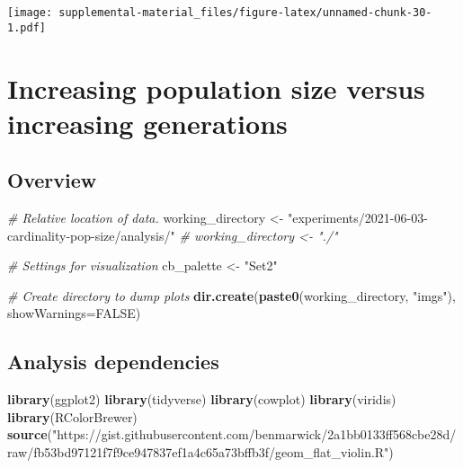 \documentclass[]{book}
\newenvironment{Shaded}{\begin{snugshade}}{\end{snugshade}}
\newcommand{\CommentTok}[1]{\textcolor[rgb]{0.56,0.35,0.01}{\textit{#1}}}
\newcommand{\DataTypeTok}[1]{\textcolor[rgb]{0.13,0.29,0.53}{#1}}
\newcommand{\KeywordTok}[1]{\textcolor[rgb]{0.13,0.29,0.53}{\textbf{#1}}}
\newcommand{\NormalTok}[1]{#1}
\newcommand{\OtherTok}[1]{\textcolor[rgb]{0.56,0.35,0.01}{#1}}
\newcommand{\StringTok}[1]{\textcolor[rgb]{0.31,0.60,0.02}{#1}}
\begin{document}
\texttt{[image: supplemental-material\_files/figure-latex/unnamed-chunk-30-1.pdf]}

\hypertarget{increasing-population-size-versus-increasing-generations}{%
\chapter{Increasing population size versus increasing generations}\label{increasing-population-size-versus-increasing-generations}}

\hypertarget{overview-2}{%
\section{Overview}\label{overview-2}}

\begin{Shaded}
\begin{Highlighting}[]
\CommentTok{# Relative location of data.}
\NormalTok{working_directory <-}
\StringTok{  "experiments/2021-06-03-cardinality-pop-size/analysis/"}
\CommentTok{# working_directory <- "./"}

\CommentTok{# Settings for visualization}
\NormalTok{cb_palette <-}\StringTok{ "Set2"}

\CommentTok{# Create directory to dump plots}
\KeywordTok{dir.create}\NormalTok{(}\KeywordTok{paste0}\NormalTok{(working_directory, }\StringTok{"imgs"}\NormalTok{), }\DataTypeTok{showWarnings=}\OtherTok{FALSE}\NormalTok{)}
\end{Highlighting}
\end{Shaded}

\hypertarget{analysis-dependencies-2}{%
\section{Analysis dependencies}\label{analysis-dependencies-2}}

\begin{Shaded}
\begin{Highlighting}[]
\KeywordTok{library}\NormalTok{(ggplot2)}
\KeywordTok{library}\NormalTok{(tidyverse)}
\KeywordTok{library}\NormalTok{(cowplot)}
\KeywordTok{library}\NormalTok{(viridis)}
\KeywordTok{library}\NormalTok{(RColorBrewer)}
\KeywordTok{source}\NormalTok{(}\StringTok{"https://gist.githubusercontent.com/benmarwick/2a1bb0133ff568cbe28d/raw/fb53bd97121f7f9ce947837ef1a4c65a73bffb3f/geom_flat_violin.R"}\NormalTok{)}
\end{Highlighting}
\end{Shaded}
\end{document}
